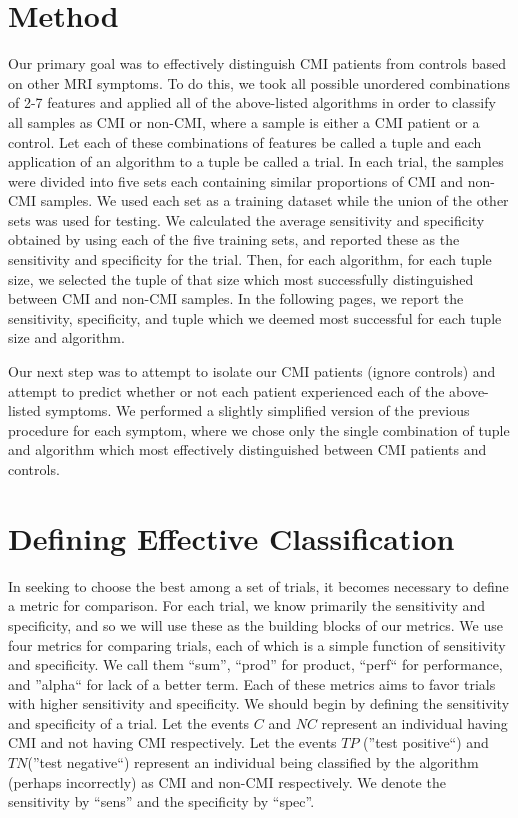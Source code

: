 \documentclass[10pt]{article}
\begin{document}
\section{Method}
Our primary goal was to effectively distinguish CMI patients from controls based on other MRI symptoms. To do this, we took all possible unordered combinations of 2-7 features and applied all of the above-listed algorithms in order to classify all samples as CMI or non-CMI, where a sample is either a CMI patient or a control. Let each of these combinations of features be called a tuple and each application of an algorithm to a tuple be called a trial. In each trial, the samples were divided into five sets each containing similar proportions of CMI and non-CMI samples. We used each set as a training dataset while the union of the other sets was used for testing. We calculated the average sensitivity and specificity obtained by using each of the five training sets, and reported these as the sensitivity and specificity for the trial. Then, for each algorithm, for each tuple size, we selected the tuple of that size which most successfully distinguished between CMI and non-CMI samples. In the following pages, we report the sensitivity, specificity, and tuple which we deemed most successful for each tuple size and algorithm.

Our next step was to attempt to isolate our CMI patients (ignore controls) and attempt to predict whether or not each patient experienced each of the above-listed symptoms. We performed a slightly simplified version of the previous procedure for each symptom, where we chose only the single combination of tuple and algorithm which most effectively distinguished between CMI patients and controls.

\pagebreak
\section{Defining Effective Classification}
In seeking to choose the best among a set of trials, it becomes necessary to define a metric for comparison. For each trial, we know primarily the sensitivity and specificity, and so we will use these as the building blocks of our metrics. We use four metrics for comparing trials, each of which is a simple function of sensitivity and specificity. We call them ``sum'', ``prod'' for product, ``perf`` for performance, and ''alpha`` for lack of a better term. Each of these metrics aims to favor trials with higher sensitivity and specificity. We should begin by defining the sensitivity and specificity of a trial. Let the events $C$ and $NC$ represent an individual having CMI and not having CMI respectively. Let the events $TP$ (''test positive``) and $TN$(''test negative``) represent an individual being classified by the algorithm (perhaps incorrectly) as CMI and non-CMI respectively. We denote the sensitivity by ``sens'' and the specificity by ``spec''. \\
\end{document}
